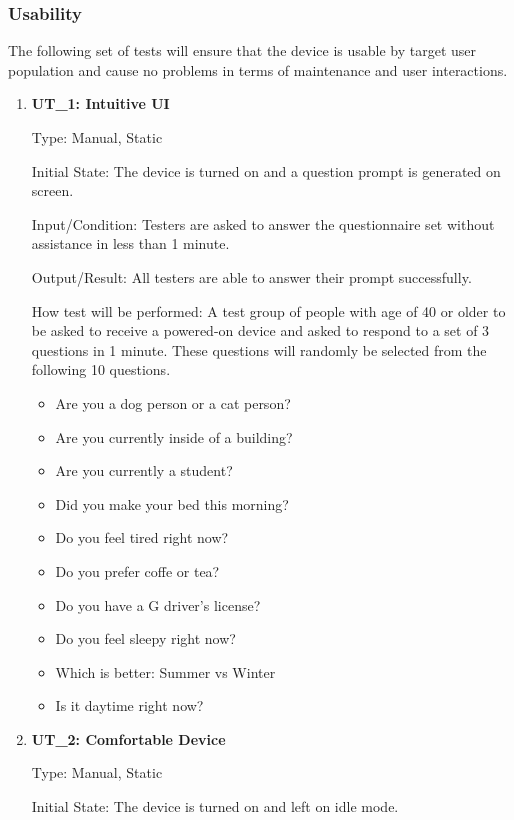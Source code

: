 \documentclass[12pt, titlepage]{article}
\begin{document}
\subsubsection{Usability}
The following set of tests will ensure that the device is usable by target user population and cause no problems in terms of maintenance and user interactions.		
\begin{enumerate}

\item\textbf{{UT\_1: Intuitive UI\\}}\label{UT1}

Type: Manual, Static
					
Initial State: The device is turned on and a question prompt is generated on screen.
					
Input/Condition: Testers are asked to answer the questionnaire set without assistance in less than 1 minute.
					
Output/Result: All testers are able to answer their prompt successfully.
					
How test will be performed: A test group of people with age of 40 or older to be asked to receive a powered-on device and asked to respond to a set of 3 questions in 1 minute. These questions will randomly be selected from the following 10 questions.

\begin{itemize}
\item Are you a dog person or a cat person?
\item Are you currently inside of a building?
\item Are you currently a student?
\item Did you make your bed this morning?
\item Do you feel tired right now?
\item Do you prefer coffe or tea?
\item Do you have a G driver's license?
\item Do you feel sleepy right now?
\item Which is better: Summer vs Winter
\item Is it daytime right now?
\end{itemize}
					
\item\textbf{{UT\_2: Comfortable Device\\}}\label{UT2}

Type: Manual, Static
					
Initial State: The device is turned on and left on idle mode.
					

\end{enumerate}
\end{document}
